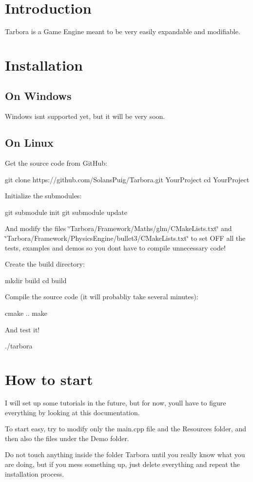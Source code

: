 \hypertarget{index_intro_sec}{}\section{Introduction}\label{index_intro_sec}
Tarbora is a Game Engine meant to be very easily expandable and modifiable. \hypertarget{index_install_sec}{}\section{Installation}\label{index_install_sec}
\hypertarget{index_windows}{}\subsection{On Windows}\label{index_windows}
Windows isn\textquotesingle{}t supported yet, but it will be very soon. \hypertarget{index_linux}{}\subsection{On Linux}\label{index_linux}
Get the source code from Git\+Hub\+: 
\begin{DoxyCode}
git clone https://github.com/SolansPuig/Tarbora.git YourProject
cd YourProject
\end{DoxyCode}


Initialize the submodules\+: 
\begin{DoxyCode}
git submodule init
git submodule update
\end{DoxyCode}
 And modify the files \char`\"{}\+Tarbora/\+Framework/\+Maths/glm/\+C\+Make\+Lists.\+txt\char`\"{} and \char`\"{}\+Tarbora/\+Framework/\+Physics\+Engine/bullet3/\+C\+Make\+Lists.\+txt\char`\"{} to set O\+FF all the tests, examples and demos so you don\textquotesingle{}t have to compile unnecessary code!

Create the build directory\+: 
\begin{DoxyCode}
mkdir build
cd build
\end{DoxyCode}


Compile the source code (it will probabliy take several minutes)\+: 
\begin{DoxyCode}
cmake ..
make
\end{DoxyCode}


And test it! 
\begin{DoxyCode}
./tarbora
\end{DoxyCode}
\hypertarget{index_getting_started}{}\section{How to start}\label{index_getting_started}
I will set up some tutorials in the future, but for now, you\textquotesingle{}ll have to figure everything by looking at this documentation.

To start easy, try to modify only the main.\+cpp file and the Resources folder, and then also the files under the Demo folder.

Do not touch anything inside the folder Tarbora until you really know what you are doing, but if you mess something up, just delete everything and repeat the installation process. 